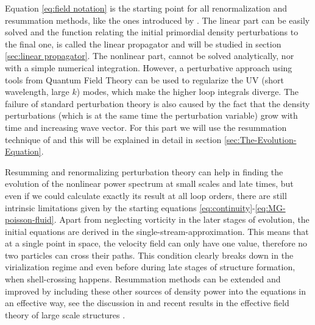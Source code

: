 




Equation \ref{eq:field notation} is the starting point for all renormalization
and resummation methods, like the ones introduced by \cite{crocce_renormalized_2005,bernardeau_evolution_2013,bernardeau_constructing_2012,
	valageas_matter_2013,anselmi_nonlinear_2012,anselmi_next--leading_2010}.
The linear part can be easily solved and the function relating the
initial primordial density perturbations to the final one, is called
the linear propagator and will be studied in section \ref{sec:linear propagator}.
The nonlinear part, cannot be solved analytically, nor with a simple
numerical integration.
However, a perturbative approach using tools from Quantum Field Theory
can be used to regularize the UV (short wavelength, large $k$) modes,
which make the higher loop integrals diverge. The failure of standard perturbation
theory is also caused by the
fact that the density perturbations (which is at the same time the
perturbation variable) grow with time and increasing wave vector.
For this part we will use the resummation technique of \cite{anselmi_nonlinear_2012}
and this will be explained in detail in section \ref{sec:The-Evolution-Equation}.

Resumming and renormalizing perturbation theory can help in finding the evolution
of the nonlinear power spectrum at small scales and late times, but
even if we could calculate exactly its result at all loop orders,
there are still intrinsic limitations given by the starting equations
\ref{eq:continuity}-\ref{eq:MG-poisson-fluid}. Apart from neglecting vorticity
in the later stages of evolution, the initial equations are derived
in the single-stream-approximation. This means that at a single point
in space, the velocity field can only have one value, therefore no two particles
can cross their paths. This condition clearly breaks
down in the virialization regime and even before during late stages of structure formation, when
shell-crossing happens. 
Resummation methods
can be extended and improved by including these other sources of density
power into the equations in an effective way, see the discussion in
\cite{manzotti_coarse_2014,pietroni_coarse-grained_2011} and recent
results in the effective field theory of large scale structures \cite{baumann_cosmological_2012,pajer_renormalization_2013,senatore_ir-resummed_2014,carrasco_effective_2012}.

